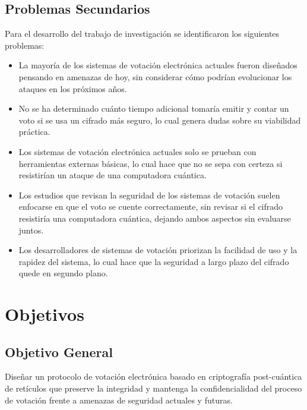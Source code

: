 \subsection{Problemas Secundarios}
Para el desarrollo del trabajo de investigación se identificaron los siguientes problemas:

\begin{itemize}
	\item La mayoría de los sistemas de votación electrónica actuales fueron diseñados pensando en amenazas de hoy, sin considerar cómo podrían evolucionar los ataques en los próximos años.
	\item No se ha determinado cuánto tiempo adicional tomaría emitir y contar un voto si se usa un cifrado más seguro, lo cual genera dudas sobre su viabilidad práctica.
	\item Los sistemas de votación electrónica actuales solo se prueban con herramientas externas básicas, lo cual hace que no se sepa con certeza si resistirían un ataque de una computadora cuántica.
	\item Los estudios que revisan la seguridad de los sistemas de votación suelen enfocarse en que el voto se cuente correctamente, sin revisar si el cifrado resistiría una computadora cuántica, dejando ambos aspectos sin evaluarse juntos.
	\item Los desarrolladores de sistemas de votación priorizan la facilidad de uso y la rapidez del sistema, lo cual hace que la seguridad a largo plazo del cifrado quede en segundo plano.
\end{itemize}

\section{Objetivos}

\subsection{Objetivo General}
Diseñar un protocolo de votación electrónica basado en criptografía post-cuántica de retículos que preserve la integridad y mantenga la confidencialidad del proceso de votación frente a amenazas de seguridad actuales y futuras. 

